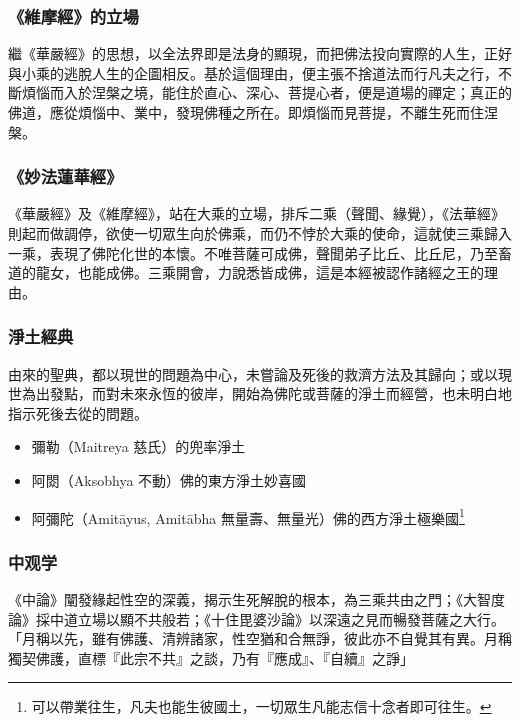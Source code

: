 \subsubsection{《維摩經》的立場}
繼《華嚴經》的思想，以全法界即是法身的顯現，而把佛法投向實際的人生，正好與小乘的逃脫人生的企圖相反。基於這個理由，便主張不捨道法而行凡夫之行，不斷煩惱而入於涅槃之境，能住於直心、深心、菩提心者，便是道場的禪定；真正的佛道，應從煩惱中、業中，發現佛種之所在。即煩惱而見菩提，不離生死而住涅槃。

\subsubsection{《妙法蓮華經》}
《華嚴經》及《維摩經》，站在大乘的立場，排斥二乘（聲聞、緣覺），《法華經》則起而做調停，欲使一切眾生向於佛乘，而仍不悖於大乘的使命，這就使三乘歸入一乘，表現了佛陀化世的本懷。不唯菩薩可成佛，聲聞弟子比丘、比丘尼，乃至畜道的龍女，也能成佛。三乘開會，力說悉皆成佛，這是本經被認作諸經之王的理由。

\subsubsection{淨土經典}
由來的聖典，都以現世的問題為中心，未嘗論及死後的救濟方法及其歸向；或以現世為出發點，而對未來永恆的彼岸，開始為佛陀或菩薩的淨土而經營，也未明白地指示死後去從的問題。
\begin{itemize}
  \item 彌勒（Maitreya 慈氏）的兜率淨土
  \item 阿閦（Aksobhya 不動）佛的東方淨土妙喜國
  \item 阿彌陀（Amitāyus, Amitābha 無量壽、無量光）佛的西方淨土極樂國\footnote{可以帶業往生，凡夫也能生彼國土，一切眾生凡能志信十念者即可往生。}
\end{itemize}

\subsubsection{中观学}
《中論》闡發緣起性空的深義，揭示生死解脫的根本，為三乘共由之門；《大智度論》採中道立場以顯不共般若；《十住毘婆沙論》以深遠之見而暢發菩薩之大行。
「月稱以先，雖有佛護、清辨諸家，性空猶和合無諍，彼此亦不自覺其有異。月稱獨契佛護，直標『此宗不共』之談，乃有『應成』、『自續』之諍」

